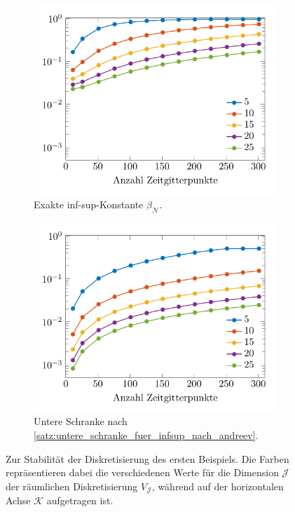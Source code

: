 \documentclass[../main.tex]{subfiles}
\begin{document}
\begin{figure}[tb!]
    \centering
    \centering
    \begin{subfigure}[b]{0.495\textwidth}
        \centering
        \includegraphics[width=1\textwidth]{figures/chapter4/stability_sine_dataset1_fig_1.pdf}
        \caption{Exakte inf-sup-Konstante $\beta_{\mathcal N}$.}
    \end{subfigure}
    \begin{subfigure}[b]{0.495\textwidth}
        \centering
        \includegraphics[width=1\textwidth]{figures/chapter4/stability_sine_dataset1_fig_2.pdf}
        \caption{Untere Schranke nach \cref{satz:untere_schranke_fuer_infsup_nach_andreev}.}
    \end{subfigure}
    \caption[Stabilität der Diskretisierung mit homogenen Randbedingungen, erstes Beispiel.]{%
        Zur Stabilität der Diskretisierung des ersten Beispiels.
        Die Farben repräsentieren dabei die verschiedenen Werte für die Dimension $\mathcal J$ der räumlichen Diskretisierung $V_{\mathcal J}$, während auf der horizontalen Achse $\mathcal K$ aufgetragen ist.
        }
    \label{figure:infsup_homogen_ein_feld}
\end{figure}
\end{document}
